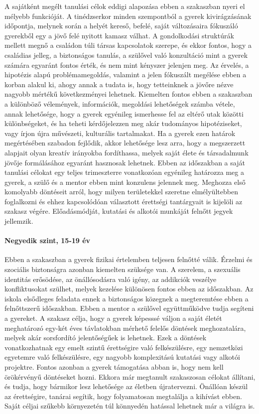 A sajátként megélt tanulási célok eddigi alapozása ebben a szakaszban nyeri el
mélyebb funkcióját. A tinédzserkor minden szempontból a gyerek kivirágzásának
időpontja, melynek során a helyét kereső, befelé, saját változásaira fókuszáló
gyerekből egy a jövő felé nyitott kamasz válhat. A gondolkodási struktúrák
mellett megnő a családon túli társas kapcsolatok szerepe, és ekkor fontos, hogy
a családias jelleg, a biztonságos tanulás, a szülővel való konzultáció mint a
gyerek számára egyaránt fontos érték, és nem mint kényszer jelenjen meg.
Az érvelés, a hipotézis alapú problémamegoldás, valamint a jelen fókuszált
megélése ebben a korban alakul ki, ahogy annak a tudata is, hogy tetteinknek a
jövőre nézve nagyobb mértékű következményei lehetnek. Kiemelten fontos ebben a
szakaszban a különböző vélemények, információk, megoldási lehetőségek számba
vétele, annak lehetősége, hogy a gyerek egyénileg ismerhesse fel az eltérő utak
közötti különbségeket, és ha teheti kérdőjelezzen meg akár tudományos
hipotéziseket, vagy írjon újra művészeti, kulturális tartalmakat.
Ha a gyerek ezen határok megértésében szabadon fejlődik, akkor lehetősége lesz
arra, hogy a megszerzett alapjait olyan kreatív irányokba fordíthassa, melyek
saját élete és társadalmunk jövője formálásához egyaránt hasznosak lehetnek.
Ebben az időszakban a saját tanulási célokat egy teljes trimeszterre
vonatkozóan egyénileg határozza meg a gyerek, a szülő és a mentor ebben mint
konzulens jelennek meg. Meghozza első komolyabb döntéseit arról, hogy milyen
területekkel szeretne elmélyültebben foglalkozni és ehhez kapcsolódóan
választott érettségi tantárgyait is kijelöli az szakasz végére.
Előadásmódját, kutatási és alkotói munkáját felnőtt jegyek jellemzik.

\paragraph{Negyedik szint, 15-19 év} Ebben a szakaszban a gyerek fizikai
értelemben teljesen felnőtté válik. Érzelmi és szociális biztonságra azonban
kiemelten szüksége van. A szerelem, a szexuális identitás erősödése, az
önállósodásra való igény, az addikciók veszélye konfliktusokat szülhet, melyek
kezelése különösen fontos ebben az időszakban.
Az iskola elsődleges feladata ennek a biztonságos közegnek a megteremtése 
ebben a felnőttszerű időszakban. Ebben a mentor a szülővel együttműködve tudja
segíteni a gyereket. A szakasz célja, hogy a gyerek képesssé váljon a saját
életét	meghatározó egy-két éves távlatokban mérhető felelős döntések
meghozatalára, melyek akár sorsfordító jelentőségűek is lehetnek. Ezek a
döntések  vonatkozhatnak egy emelt szintű érettségire való felkészülésre, egy
nemzetközi egyetemre való felkészülésre, egy nagyobb komplexitású kutatási vagy
alkotói projektre. Fontos azonban a gyerek támogatása abban is, hogy nem kell
örökérvényű döntéseket hozni. Ekkora már megtanult szakaszosan célokat
állítani, és tudja, hogy bármikor lesz lehetősége az életben újratervezni.
Önállóan készül az érettségire, tanárai segítik, hogy folyamatosan
megtalálja a kihívást ebben. Saját céljai szűkebb környezetén túl
könnyedén hatással lehetnek már a világra is.

